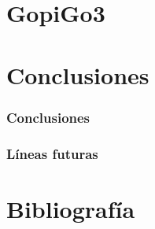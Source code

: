 \documentclass{report}
\begin{document}
\chapter{GopiGo3}

\chapter{Conclusiones}
\subsection{Conclusiones}
\subsection{Líneas futuras}

\chapter{Bibliografía}
\end{document}
